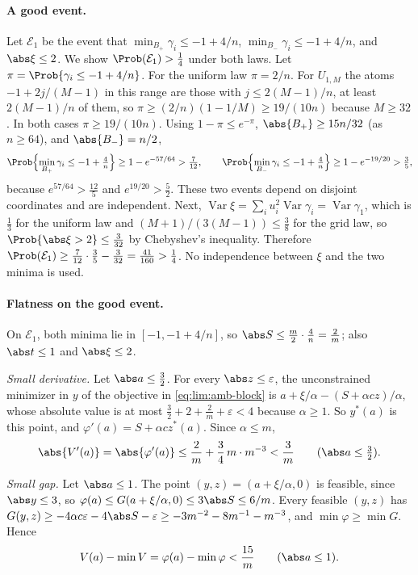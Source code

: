 \paragraph{A good event.}
Let $\mathcal E_1$ be the event that $\min_{B_+}\gamma_i\le-1+4/n$,
$\min_{B_-}\gamma_i\le-1+4/n$, and $\abs\xi\le2$. We show
$\Prob(\mathcal E_1)>\frac14$ under both laws. Let
$\pi=\Prob\{\gamma_i\le-1+4/n\}$. For the uniform law $\pi=2/n$. For
$U_{1,M}$ the atoms $-1+2j/(M-1)$ in this range are those with
$j\le2(M-1)/n$, at least $2(M-1)/n$ of them, so
$\pi\ge(2/n)(1-1/M)\ge19/(10n)$ because $M\ge32$. In both cases
$\pi\ge19/(10n)$. Using $1-\pi\le e^{-\pi}$, $\abs{B_+}\ge15n/32$ (as
$n\ge64$), and $\abs{B_-}=n/2$,
\[
 \Prob\Bigl\{\min_{B_+}\gamma_i\le-1+\tfrac4n\Bigr\}\ge1-e^{-57/64}>\tfrac7{12},
 \qquad
 \Prob\Bigl\{\min_{B_-}\gamma_i\le-1+\tfrac4n\Bigr\}\ge1-e^{-19/20}>\tfrac35,
\]
because $e^{57/64}>\frac{12}5$ and $e^{19/20}>\frac52$. These two events
depend on disjoint coordinates and are independent. Next,
$\operatorname{Var}\xi=\sum_iu_i^2\operatorname{Var}\gamma_i=\operatorname{Var}
\gamma_1$, which is $\frac13$ for the uniform law and $(M+1)/(3(M-1))\le\frac38$
for the grid law, so $\Prob\{\abs\xi>2\}\le\frac3{32}$ by Chebyshev's
inequality. Therefore $\Prob(\mathcal E_1)\ge\frac7{12}\cdot\frac35-\frac3{32}
=\frac{41}{160}>\frac14$. No independence between $\xi$ and the two minima is
used.

\paragraph{Flatness on the good event.}
On $\mathcal E_1$, both minima lie in $[-1,-1+4/n]$, so
$\abs S\le\frac m2\cdot\frac4n=\frac2m$; also $\abs t\le1$ and
$\abs\xi\le2$.

\emph{Small derivative.} Let $\abs a\le\frac32$. For every
$\abs z\le\varepsilon$, the unconstrained minimizer in $y$ of the objective in
\eqref{eq:lim:amb-block} is $a+\xi/\alpha-(S+\alpha cz)/\alpha$, whose
absolute value is at most $\frac32+2+\frac2m+\varepsilon<4$ because
$\alpha\ge1$. So $y^*(a)$ is this point, and
$\varphi'(a)=S+\alpha cz^*(a)$. Since $\alpha\le m$,
\begin{equation}\label{eq:lim:amb-flat}
 \abs{V'(a)}=\abs{\varphi'(a)}\le\frac2m+\frac34\,m\cdot m^{-3}<\frac3m
 \qquad(\abs a\le\tfrac32).
\end{equation}

\emph{Small gap.} Let $\abs a\le1$. The point $(y,z)=(a+\xi/\alpha,0)$ is
feasible, since $\abs y\le3$, so $\varphi(a)\le G(a+\xi/\alpha,0)\le3\abs S\le
6/m$. Every feasible $(y,z)$ has
$G(y,z)\ge-4\alpha c\varepsilon-4\abs S-\varepsilon\ge-3m^{-2}-8m^{-1}-m^{-3}$,
and $\min\varphi\ge\min G$. Hence
\begin{equation}\label{eq:lim:amb-gap}
 V(a)-\min V=\varphi(a)-\min\varphi<\frac{15}m\qquad(\abs a\le1).
\end{equation}


